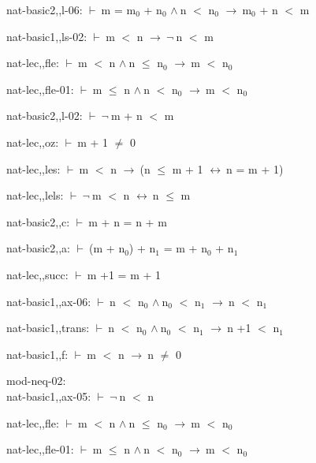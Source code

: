\documentclass[a4paper]{article}
\newcommand{\Fol}{\mbox{$\vdash\ $}}
\newcommand{\Not}{\mbox{$\neg\ $}}
\newcommand{\And}{\mbox{$\wedge\ $}}
\newcommand{\Imp}{\mbox{$\rightarrow\ $}}
\newcommand{\Equiv}{\mbox{$\leftrightarrow\ $}}
\begin{document}
nat-basic2,,l-06: 
 \Fol m = $\mbox{m}_{0}$ + $\mbox{n}_{0}$ \And n $<$ $\mbox{n}_{0}$ \Imp $\mbox{m}_{0}$ + n $<$ m



nat-basic1,,ls-02: 
 \Fol m $<$ n \Imp \Not n $<$ m



nat-lec,,fle: 
 \Fol m $<$ n \And n $\le$ $\mbox{n}_{0}$ \Imp m $<$ $\mbox{n}_{0}$



nat-lec,,fle-01: 
 \Fol m $\le$ n \And n $<$ $\mbox{n}_{0}$ \Imp m $<$ $\mbox{n}_{0}$



nat-basic2,,l-02: 
 \Fol \Not m + n $<$ m



nat-lec,,oz: 
 \Fol m + 1 $\neq$ 0



nat-lec,,les: 
 \Fol m $<$ n \Imp (n $\le$ m + 1 \Equiv n = m + 1)



nat-lec,,lels: 
 \Fol \Not m $<$ n \Equiv n $\le$ m



nat-basic2,,c: 
 \Fol m + n = n + m



nat-basic2,,a: 
 \Fol (m + $\mbox{n}_{0}$) + $\mbox{n}_{1}$ = m + $\mbox{n}_{0}$ + $\mbox{n}_{1}$



nat-lec,,succ: 
 \Fol m +1 = m + 1



nat-basic1,,ax-06: 
 \Fol n $<$ $\mbox{n}_{0}$ \And $\mbox{n}_{0}$ $<$ $\mbox{n}_{1}$ \Imp n $<$ $\mbox{n}_{1}$



nat-basic1,,trans: 
 \Fol n $<$ $\mbox{n}_{0}$ \And $\mbox{n}_{0}$ $<$ $\mbox{n}_{1}$ \Imp n +1 $<$ $\mbox{n}_{1}$



nat-basic1,,f: 
 \Fol m $<$ n \Imp n $\neq$ 0



\bigskip

mod-neq-02:\\ nat-basic1,,ax-05: 
 \Fol \Not n $<$ n



nat-lec,,fle: 
 \Fol m $<$ n \And n $\le$ $\mbox{n}_{0}$ \Imp m $<$ $\mbox{n}_{0}$



nat-lec,,fle-01: 
 \Fol m $\le$ n \And n $<$ $\mbox{n}_{0}$ \Imp m $<$ $\mbox{n}_{0}$
\end{document}
